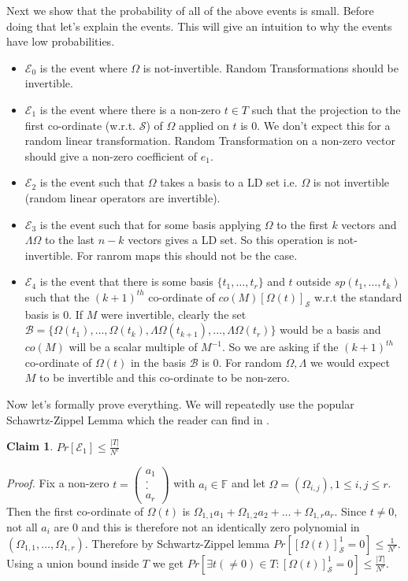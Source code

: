 \documentclass[letterpaper,USenglish,numberwithinsect]{lipics}
\newcommand{\F}{\mathbb{F}}
\newcommand{\MB}{\mathcal{B}}
\newcommand{\ME}{\mathcal{E}}
\newcommand{\MS}{\mathcal{S}}
\newtheorem{claim}[theorem]{Claim}
\begin{document}
Next we show that the probability of all of the above events is small. Before doing that let's explain the events. This will give an intuition to why the events have low probabilities.
\begin{itemize}
\item $\ME_0$ is the event where $\Omega$ is not-invertible. Random Transformations should be invertible.
\item $\ME_1$ is the event where there is a non-zero $t\in T$
such that the projection to the first  co-ordinate (w.r.t. $\MS$) of $\Omega$ applied on $t$ is $0$. We don't expect this for
a random linear transformation. Random Transformation on a non-zero vector should give a non-zero coefficient of $e_1$.
\item $\ME_2$ is the event such that $\Omega$ takes a basis to a LD set i.e. $\Omega$ is not invertible (random linear operators are invertible).
\item $\ME_3$ is the event such that for some basis applying $\Omega$ to the first $k$ vectors and $\Lambda\Omega$ to the last $n-k$ vectors gives a LD set. So this operation is not-invertible. For
ranrom maps this should not be the case.
\item  $\ME_4$ is the event that there is some basis $\{t_1,\ldots,t_r\}$ and
$t$ outside $sp(t_1,\ldots,t_k)$ such that the $(k+1)^{th}$ co-ordinate
of $co(M)[\Omega(t)]_\MS$ w.r.t the standard basis is $0$. If $M$ were invertible, clearly the set
$ \MB = \{\Omega(t_1),\ldots,\Omega(t_k),\Lambda\Omega(t_{k+1}), \ldots , \Lambda\Omega(t_r) \}$
would be a basis and $co(M)$ will be a scalar multiple
of $M^{-1}$. So we are asking if the $(k+1)^{th}$ co-ordinate of $\Omega(t)$
in the basis $\MB$ is $0$. For random $\Omega,\Lambda$ we would
expect $M$ to be invertible and this co-ordinate to be non-zero.
\end{itemize}

Now let's formally prove everything. We will repeatedly use the popular Schawrtz-Zippel Lemma which the reader can find in \cite{Sax09}.

\begin{claim}
 $Pr[\ME_1] \leq \frac{|T|}{N^r}$
\end{claim}

\emph{Proof.}
 Fix a non-zero $t = \left(\begin{array}{c} a_1\\.\\.\\a_r\end{array}\right)$ with $a_i\in \F$ and let $\Omega = (\Omega_{i,j}), 1\leq i,j\leq
r$. Then the first co-ordinate of $\Omega(t)$ is $\Omega_{1,1}a_1 + \Omega_{1,2}a_2+\ldots + \Omega_{1,r}a_r$. Since $t\neq 0$, not all $a_i$ are
$0$ and this is therefore not an identically zero
polynomial in $(\Omega_{1,1},\ldots,\Omega_{1,r})$. Therefore by Schwartz-Zippel lemma $ Pr[[\Omega(t)]^1_{\MS}= 0] \leq \frac{1}{N^r} $. Using a union bound inside $T$ we get $ Pr[ \exists t (\neq
0)\in T :
 [\Omega(t)]^1_{\MS} =0] \leq
  \frac{|T|}{N^r}$.
\end{document}
